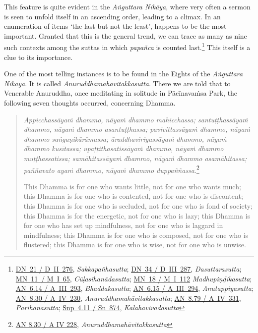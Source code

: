 This feature is quite evident in the \emph{Aṅguttara Nikāya}, where very often a sermon is seen to unfold itself in an ascending order, leading to a climax. In an enumeration of items `the last but not the least', happens to be the most important. Granted that this is the general trend, we can trace as many as nine such contexts among the suttas in which \emph{papañca} is counted last.\footnote{\href{https://suttacentral.net/dn21/pli/ms}{DN~21 / D~II~276}, \emph{Sakkapañhasutta}; \href{https://suttacentral.net/dn34/pli/ms}{DN~34 / D~III~287}, \emph{Dasuttarasutta}; \href{https://suttacentral.net/mn11/pli/ms}{MN~11~/ M~I~65}, \emph{Cūḷasīhanādasutta}; \href{https://suttacentral.net/mn18/pli/ms}{MN~18 / M~I~112} \emph{Madhupiṇḍikasutta}; \href{https://suttacentral.net/an6.14/pli/ms}{AN~6.14 / A~III~293}, \emph{Bhaddakasutta}; \href{https://suttacentral.net/an6.15/pli/ms}{AN~6.15 / A~III~294}, \emph{Anutappiyasutta}; \href{https://suttacentral.net/an8.30/pli/ms}{AN~8.30 / A~IV~230}, \emph{Anuruddhamahāvitakkasutta}; \href{https://suttacentral.net/an8.79/pli/ms}{AN~8.79 / A~IV~331}, \emph{Parihānasutta}; \href{https://suttacentral.net/snp4.11/pli/ms}{Snp~4.11 / Sn~874}, \emph{Kalahavivādasutta}} This itself is a clue to its importance.

One of the most telling instances is to be found in the Eights of the \emph{Aṅguttara Nikāya}. It is called \emph{Anuruddhamahāvitakkasutta}. There we are told that to Venerable Anuruddha, once meditating in solitude in Pācīnavaṁsa Park, the following seven thoughts occurred, concerning Dhamma.

\begin{quote}
\emph{Appicchassāyaṁ dhammo, nāyaṁ dhammo mahicchassa; santuṭṭhassāyaṁ dhammo, nāyaṁ dhammo asantuṭṭhassa; pavivittassāyaṁ dhammo, nāyaṁ dhammo saṅgaṇikārāmassa; āraddhaviriyassāyaṁ dhammo, nāyaṁ dhammo kusītassa; upaṭṭithasatissāyaṁ dhammo, nāyaṁ dhammo muṭṭhassatissa; samāhitassāyaṁ dhammo, nāyaṁ dhammo asamāhitassa; paññavato ayaṁ dhammo, nāyaṁ dhammo duppaññassa}.\footnote{\href{https://suttacentral.net/an8.30/pli/ms}{AN 8.30 / A IV 228}, \emph{Anuruddhamahāvitakkasutta}}

This Dhamma is for one who wants little, not for one who wants much; this Dhamma is for one who is contented, not for one who is discontent; this Dhamma is for one who is secluded, not for one who is fond of society; this Dhamma is for the energetic, not for one who is lazy; this Dhamma is for one who has set up mindfulness, not for one who is laggard in mindfulness; this Dhamma is for one who is composed, not for one who is flustered; this Dhamma is for one who is wise, not for one who is unwise.
\end{quote}

